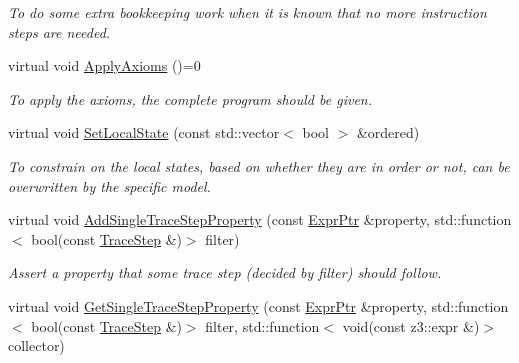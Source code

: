 \begin{DoxyCompactItemize}
\begin{DoxyCompactList}\small\item\em To do some extra bookkeeping work when it is known that no more instruction steps are needed. \end{DoxyCompactList}\item 
\mbox{\label{classilang_1_1_memory_model_ad156cb7f836b1be79678218df10fb5ae}} 
virtual void \mbox{\hyperlink{classilang_1_1_memory_model_ad156cb7f836b1be79678218df10fb5ae}{Apply\+Axioms}} ()=0
\begin{DoxyCompactList}\small\item\em To apply the axioms, the complete program should be given. \end{DoxyCompactList}\item 
\mbox{\label{classilang_1_1_memory_model_a9c55831533a42c8dbc006e50011c9111}} 
virtual void \mbox{\hyperlink{classilang_1_1_memory_model_a9c55831533a42c8dbc006e50011c9111}{Set\+Local\+State}} (const std\+::vector$<$ bool $>$ \&ordered)
\begin{DoxyCompactList}\small\item\em To constrain on the local states, based on whether they are in order or not, can be overwritten by the specific model. \end{DoxyCompactList}\item 
\mbox{\label{classilang_1_1_memory_model_a5ea328da08e4caa6aae8ea835e220632}} 
virtual void \mbox{\hyperlink{classilang_1_1_memory_model_a5ea328da08e4caa6aae8ea835e220632}{Add\+Single\+Trace\+Step\+Property}} (const \mbox{\hyperlink{namespaceilang_a7c4196c72e53ea4df4b7861af7bc3bce}{Expr\+Ptr}} \&property, std\+::function$<$ bool(const \mbox{\hyperlink{classilang_1_1_trace_step}{Trace\+Step}} \&)$>$ filter)
\begin{DoxyCompactList}\small\item\em Assert a property that some trace step (decided by filter) should follow. \end{DoxyCompactList}\item 
\mbox{\label{classilang_1_1_memory_model_a60611fca6e7e2968b5156339b8e8760c}} 
virtual void \mbox{\hyperlink{classilang_1_1_memory_model_a60611fca6e7e2968b5156339b8e8760c}{Get\+Single\+Trace\+Step\+Property}} (const \mbox{\hyperlink{namespaceilang_a7c4196c72e53ea4df4b7861af7bc3bce}{Expr\+Ptr}} \&property, std\+::function$<$ bool(const \mbox{\hyperlink{classilang_1_1_trace_step}{Trace\+Step}} \&)$>$ filter, std\+::function$<$ void(const z3\+::expr \&)$>$ collector)

\end{DoxyCompactItemize}
